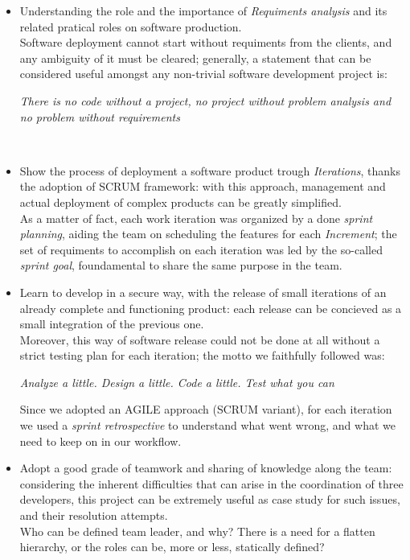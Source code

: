 \documentclass{llncs}
\newenvironment{nscenter}
 {\parskip=0pt\par\nopagebreak\centering}
 {\par\noindent\ignorespacesafterend}
\begin{document}
\begin{itemize}
\item Understanding the role and the importance of \textit{Requiments analysis} and its related pratical roles on software production.\\
Software deployment cannot start without requiments from the clients, and any ambiguity of it must be cleared; generally, a statement that can be considered useful amongst any non-trivial software development project is:\\
\begin{nscenter}
\textit{There is no code without a project, no project without problem
analysis and no problem without requirements}
\end{nscenter}\\
\item Show the process of deployment a software product trough \textit{Iterations}, thanks the adoption of SCRUM framework: with this approach, management and actual deployment of complex products can be greatly simplified.\\
As a matter of fact, each work iteration was organized by a done \textit{sprint planning}, aiding the team on scheduling the features for each \textit{Increment}; the set of requiments to accomplish on each iteration was led by the so-called \textit{sprint goal}, foundamental to share the same purpose in the team.\\
\item Learn to develop in a secure way, with the release of small iterations of an already complete and functioning product: each release can be concieved as a small integration of the previous one.\\
Moreover, this way of software release could not be done at all without a strict testing plan for each iteration; the motto we faithfully followed was:\\
\begin{nscenter}
\textit{Analyze a little. Design a little. Code a little. Test what you can}
\end{nscenter}
Since we adopted an AGILE approach (SCRUM variant), for each iteration we used a \textit{sprint retrospective} to understand what went wrong, and what we need to keep on in our workflow.\\
\item Adopt a good grade of teamwork and sharing of knowledge along the team: considering the inherent difficulties that can arise in the coordination of three developers, this project can be extremely useful as case study for such issues, and their resolution attempts.\\
Who can be defined team leader, and why? There is a need for a flatten hierarchy, or the roles can be, more or less, statically defined?


\end{itemize}
\end{document}
